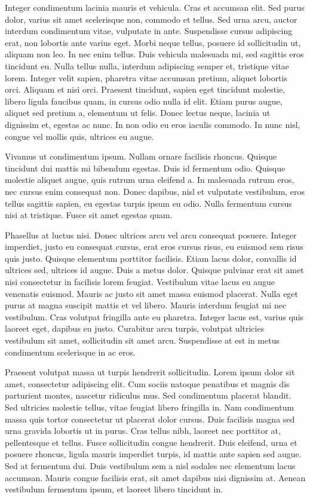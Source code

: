 Integer condimentum lacinia mauris et vehicula. Cras et accumsan elit. Sed purus dolor, varius sit amet scelerisque non, commodo et tellus. Sed urna arcu, auctor interdum condimentum vitae, vulputate in ante. Suspendisse cursus adipiscing erat, non lobortis ante varius eget. Morbi neque tellus, posuere id sollicitudin ut, aliquam non leo. In nec enim tellus. Duis vehicula malesuada mi, sed sagittis eros tincidunt eu. Nulla tellus nulla, interdum adipiscing semper et, tristique vitae lorem. Integer velit sapien, pharetra vitae accumsan pretium, aliquet lobortis orci. Aliquam et nisi orci. Praesent tincidunt, sapien eget tincidunt molestie, libero ligula faucibus quam, in cursus odio nulla id elit. Etiam purus augue, aliquet sed pretium a, elementum ut felis. Donec lectus neque, lacinia ut dignissim et, egestas ac nunc. In non odio eu eros iaculis commodo. In nunc nisl, congue vel mollis quis, ultrices eu augue.

Vivamus ut condimentum ipsum. Nullam ornare facilisis rhoncus. Quisque tincidunt dui mattis mi bibendum egestas. Duis id fermentum odio. Quisque molestie aliquet augue, quis rutrum urna eleifend a. In malesuada rutrum eros, nec cursus enim consequat non. Donec dapibus, nisl et vulputate vestibulum, eros tellus sagittis sapien, eu egestas turpis ipsum eu odio. Nulla fermentum cursus nisi at tristique. Fusce sit amet egestas quam.

Phasellus at luctus nisi. Donec ultrices arcu vel arcu consequat posuere. Integer imperdiet, justo eu consequat cursus, erat eros cursus risus, eu euismod sem risus quis justo. Quisque elementum porttitor facilisis. Etiam lacus dolor, convallis id ultrices sed, ultrices id augue. Duis a metus dolor. Quisque pulvinar erat sit amet nisi consectetur in facilisis lorem feugiat. Vestibulum vitae lacus eu augue venenatis euismod. Mauris ac justo sit amet massa euismod placerat. Nulla eget purus at magna suscipit mattis et vel libero. Mauris interdum feugiat mi nec vestibulum. Cras volutpat fringilla ante eu pharetra. Integer lacus est, varius quis laoreet eget, dapibus eu justo. Curabitur arcu turpis, volutpat ultricies vestibulum sit amet, sollicitudin sit amet arcu. Suspendisse at est in metus condimentum scelerisque in ac eros.

Praesent volutpat massa ut turpis hendrerit sollicitudin. Lorem ipsum dolor sit amet, consectetur adipiscing elit. Cum sociis natoque penatibus et magnis dis parturient montes, nascetur ridiculus mus. Sed condimentum placerat blandit. Sed ultricies molestie tellus, vitae feugiat libero fringilla in. Nam condimentum massa quis tortor consectetur ut placerat dolor cursus. Duis facilisis magna sed urna gravida lobortis ut in purus. Cras tellus nibh, laoreet nec porttitor at, pellentesque et tellus. Fusce sollicitudin congue hendrerit. Duis eleifend, urna et posuere rhoncus, ligula mauris imperdiet turpis, id mattis ante sapien sed augue. Sed at fermentum dui. Duis vestibulum sem a nisl sodales nec elementum lacus accumsan. Mauris congue facilisis erat, sit amet dapibus nisi dignissim at. Aenean vestibulum fermentum ipsum, et laoreet libero tincidunt in.

